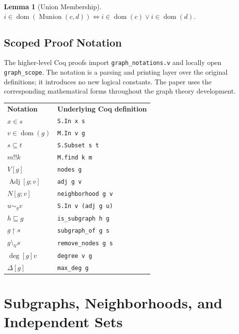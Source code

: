 \documentclass[11pt]{article}
\theoremstyle{plain}
\newtheorem{lemma}[theorem]{Lemma}
\theoremstyle{definition}
\theoremstyle{remark}
\newcommand{\Mdomain}{\operatorname{dom}}
\newcommand{\Munion}{\operatorname{Munion}}
\newcommand{\verticesof}[1]{V[#1]}
\newcommand{\adjset}[2]{\operatorname{Adj}[#1;#2]}
\newcommand{\nbdgraph}[2]{N[#1;#2]}
\newcommand{\maplookup}[2]{#1\mathbin{!!}#2}
\newcommand{\induced}[2]{#1\mathbin{\upharpoonright}#2}
\newcommand{\withoutvertices}[2]{#1\mathbin{\setminus_{V}}#2}
\newcommand{\subgraphrel}{\sqsubseteq}
\newcommand{\adjacentin}[3]{#1\mathrel{\sim_{#2}}#3}
\newcommand{\degreeof}[2]{\operatorname{deg}[#1]#2}
\newcommand{\maxdegreeof}[1]{\Delta[#1]}
\begin{document}
\begin{lemma}[Union Membership]
\label{lem:munion-in}
$i \in \operatorname{dom}(\Munion(c,d)) \iff i \in \operatorname{dom}(c) \lor i \in \operatorname{dom}(d)$.
\end{lemma}

\subsection{Scoped Proof Notation}

The higher-level Coq proofs import \texttt{graph\_notations.v} and locally
open \texttt{graph\_scope}.  The notation is a parsing and printing layer
over the original definitions; it introduces no new logical constants.
The paper uses the corresponding mathematical forms throughout the graph
theory development.

\begin{center}
\begin{tabular}{ll}
\textbf{Notation} & \textbf{Underlying Coq definition} \\
$x \in s$ & \texttt{S.In x s} \\
$v \in \Mdomain(g)$ & \texttt{M.In v g} \\
$s \subseteq t$ & \texttt{S.Subset s t} \\
$\maplookup{m}{k}$ & \texttt{M.find k m} \\
$\verticesof{g}$ & \texttt{nodes g} \\
$\adjset{g}{v}$ & \texttt{adj g v} \\
$\nbdgraph{g}{v}$ & \texttt{neighborhood g v} \\
$\adjacentin{u}{g}{v}$ & \texttt{S.In v (adj g u)} \\
$h \subgraphrel g$ & \texttt{is\_subgraph h g} \\
$\induced{g}{s}$ & \texttt{subgraph\_of g s} \\
$\withoutvertices{g}{s}$ & \texttt{remove\_nodes g s} \\
$\degreeof{g}{v}$ & \texttt{degree v g} \\
$\maxdegreeof{g}$ & \texttt{max\_deg g}
\end{tabular}
\end{center}

\section{Subgraphs, Neighborhoods, and Independent Sets}
\label{sec:subgraph}
\end{document}
